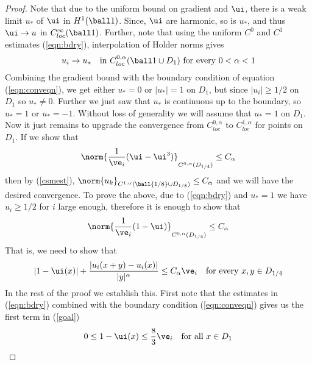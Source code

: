 \begin{proof}
Note that due to the uniform bound on gradient and $\ui$, there is a weak limit $u_*$ of $\ui$ in $H^1(\ball 1)$. Since, $\ui$ are harmonic, so is $u_*$, and thus $\ui \to u$ in $C^{\infty}_{loc}(\ball 1)$. Further, note that using the uniform $C^0$ and $C^1$ estimates (\ref{eqn:bdry}), interpolation of Holder norms gives 
\begin{equation}\label{alphaconv}
    u_i \to u_* \quad \text{in $C^{0,\alpha}_{loc}(\ball 1 \cup D_1)$ for every $0<\alpha<1$} 
\end{equation} 
Combining the gradient bound with the boundary condition of equation (\ref{eqn:conveqn}), we get either $u_*=0$ or $|u_*|=  1$ on $D_1$, but since $|u_i| \geq 1/2$ on $D_1$ so $u_* \neq 0$. Further we just saw that $u_*$ is continuous up to the boundary, so $u_*=1$ or $u_*=-1$. Without loss of generality we will assume that $u_*=1$ on $D_1$. Now it just remains to upgrade the convergence from $C^{0,\alpha}_{loc}$ to $C^{1,\alpha}_{loc}$ for points on $D_1$. If we show that 
$$
\norm{\frac{1}{\ve_i}(\ui-\ui^3)}_{C^{0,\alpha}(D_{1/4})} \leq C_{\alpha}
$$
then by (\ref{csmest}), $\norm{u_k}_{C^{1,\alpha}({\ball {1/8} \cup D_{1/8}})} \leq C_{\alpha}$ and we will have the desired convergence. To prove the above, due to (\ref{eqn:bdry}) and $u_*=1$ we have $u_i\geq 1/2$ for $i$ large enough, therefore it is enough to show that
\begin{equation} \label{eqn:convlemmaest}
\norm{\frac{1}{\ve_i}(1-\ui)}_{C^{0,\alpha}(D_{1/4})} \leq C_{\alpha}
\end{equation}
That is, we need to show that
\begin{equation} \label{goal}
     |1-\ui(x)| + \frac{|u_i(x+y)-u_i(x)|}{|y|^\alpha} \leq C_\alpha \ve_i \quad \text{for every } x,y \in D_{1/4}
\end{equation}
In the rest of the proof we establish this. First note that the estimates in (\ref{eqn:bdry}) combined with the boundary condition (\ref{eqn:conveqn}) gives us the first term in (\ref{goal}) 
\begin{equation}\label{eqn:hest}
    0 \leq 1-\ui(x) \leq \frac{8}{3}\ve_i \quad \text{for all } x \in D_1
\end{equation}


\end{proof}
